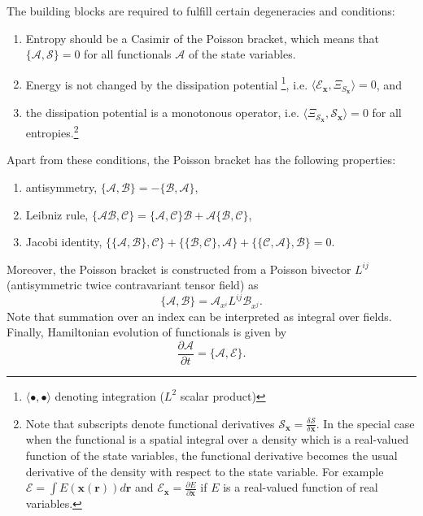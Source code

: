 \documentclass[twoside]{article}
\newcommand{\rr}{{\boldsymbol{r}}}
\newcommand{\xx}{{\boldsymbol{x}}}
\newcommand{\AF}{\mathscr{A}}
\newcommand{\BF}{\mathscr{B}}
\newcommand{\CF}{\mathscr{C}}
\newcommand{\SF}{\mathscr{S}}
\newcommand{\EF}{\mathscr{E}}
\newcommand{\pd}{\partial}
\newcommand{\IP}[1]{ \textcolor{blue}   {\small\texttt{
\texttt{[image: pin\_small.jpeg]} Ilya: #1}} }
\begin{document}
The building blocks are required to fulfill certain degeneracies and 
conditions: 
\begin{enumerate}
\item 
Entropy should be a Casimir of the Poisson bracket, which means 
that $\{\AF,\SF\}=0$ for all functionals $\AF$ of the state variables. 
\item Energy is 
not changed by the dissipation potential
\footnote{$\langle\bullet,\bullet\rangle$ denoting integration ($L^2$ scalar product)}, i.e. $\langle \EF_\xx, \Xi_{S_\xx}\rangle 
= 
0$, and 
\item the dissipation potential is a monotonous operator, i.e. $\langle 
\Xi_{\SF_\xx}, \SF_\xx\rangle = 0$ for all entropies.\footnote{Note that 
subscripts 
denote functional derivatives $\SF_\xx = \frac{\delta\SF}{\delta\xx}$. In the special case when 
the functional is a spatial integral over a density which is a real-valued function of the state variables, 
the functional derivative becomes the usual derivative of the density with 
respect to the state variable. For example $\EF = \int E(\xx(\rr))d\rr$ and 
$\EF_\xx = \frac{\partial E}{\partial \xx}$ if $E$ is a real-valued function of 
real variables.}
\end{enumerate}

Apart from these conditions, the Poisson bracket has the following properties: 
\begin{enumerate}
\item 
antisymmetry,  $\{\AF,\BF\}=-\{\BF,\AF\}$, 
\item
Leibniz rule, $\{\AF\BF, \CF\} = 
\{\AF,\CF\}\BF + \AF\{\BF,\CF\}$, 
\item
Jacobi identity, $\{\{\AF,\BF\},\CF\} + \{\{\BF,\CF\},\AF\}+\{\{\CF,\AF\},\BF\} 
= 0$.
\end{enumerate}
 Moreover, the Poisson bracket is constructed 
from a Poisson bivector $L^{ij}$ (antisymmetric twice contravariant tensor 
field) as 
\begin{equation}
\{\AF,\BF\} = \AF_{x^i} L^{ij} \BF_{x^j}.
\end{equation}
Note that summation over an index can be interpreted as integral over fields. 
Finally, Hamiltonian evolution of functionals is given by
\begin{equation}
\frac{\pd \AF}{\pd t} = \{\AF,\EF\}.
\end{equation}
\end{document}
